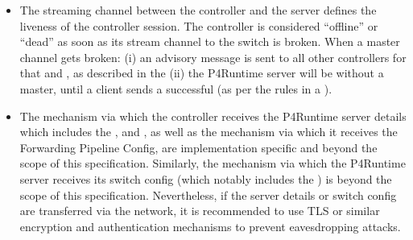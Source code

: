 \documentclass[11pt]{article}
\begin{document}
{\begin{itemize}
\item{}
The streaming channel between the controller and the server defines the
liveness of the controller session. The controller is considered \textquotedblleft{}offline\textquotedblright{} or
\textquotedblleft{}dead\textquotedblright{} as soon as its stream channel to the switch is broken. When a master
channel gets broken: (i) an advisory message is sent to all other controllers
for that  and , as described in the
 (ii) the P4Runtime server
will be without a master, until a client sends a successful
 (as per the rules in a
).%

\item{}
The mechanism via which the controller receives the P4Runtime server details
which includes the ,  and , as well as the mechanism via
which it receives the Forwarding Pipeline Config, are implementation specific
and beyond the scope of this specification. Similarly, the mechanism via which
the P4Runtime server receives its switch config (which notably includes the
) is beyond the scope of this specification.  Nevertheless, if the
server details or switch config are transferred via the network, it is
recommended to use TLS or similar encryption and authentication mechanisms to
prevent eavesdropping attacks.%
\end{itemize}%

}
\end{document}
